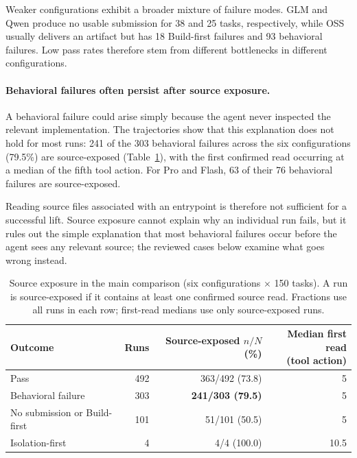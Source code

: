 \documentclass[acmsmall,screen,review,anonymous]{acmart}
\begin{document}
Weaker configurations exhibit a broader mixture of failure modes. GLM and Qwen
produce no usable submission for 38 and 25 tasks, respectively, while OSS
usually delivers an artifact but has 18 Build-first failures and 93 behavioral
failures. Low pass rates therefore stem from different bottlenecks in different
configurations.

\paragraph{Behavioral failures often persist after source exposure.}
A behavioral failure could arise simply because the agent never inspected the
relevant implementation. The trajectories show that this explanation does not
hold for most runs: 241 of the 303 behavioral failures across the six
configurations (79.5\%) are source-exposed (Table~\ref{tab:source-exposure}),
with the first confirmed read occurring at a median of the fifth tool action. For Pro
and Flash, 63 of their 76 behavioral failures are source-exposed.

Reading source files associated with an entrypoint is therefore not sufficient
for a successful lift. Source exposure cannot explain why an individual run
fails, but it rules out the simple explanation that most behavioral failures
occur before the agent sees any relevant source; the reviewed cases below
examine what goes wrong instead.

\begin{table}[htbp]
  \centering
    \caption{Source exposure in the main comparison (six configurations
    $\times$ 150 tasks). A run is source-exposed if it contains at least one
    confirmed source read. Fractions use all runs in each row; first-read
    medians use only source-exposed runs.}
    \label{tab:source-exposure}

    \centering
    \footnotesize

    \begin{tabular}{@{}lrrr@{}}
      \toprule
      Outcome
        & Runs
        & \shortstack{Source-exposed\\$n/N$ (\%)}
        & \shortstack{Median first read\\(tool action)} \\
      \midrule
      Pass & 492 & 363/492 (73.8) & 5 \\
      Behavioral failure & 303 & \textbf{241/303 (79.5)} & 5 \\
      No submission or Build-first & 101 & 51/101 (50.5) & 5 \\
      Isolation-first & 4 & 4/4 (100.0) & 10.5 \\

      \bottomrule
    \end{tabular}

\end{table}
\end{document}
